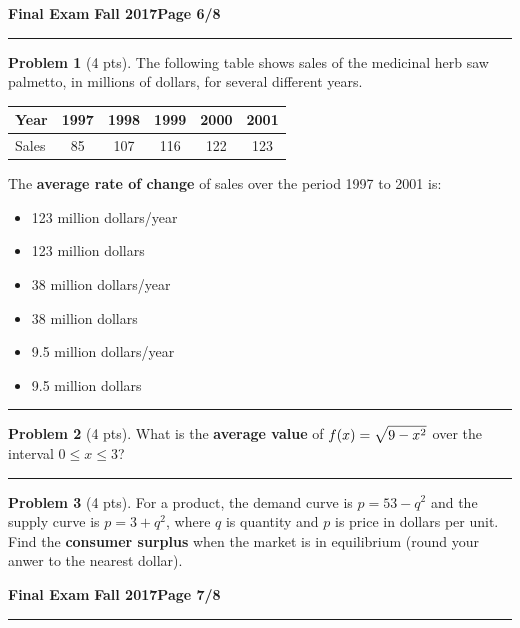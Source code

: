 \documentclass[12pt]{article}
\makeatletter
\theoremstyle{definition}
\newtheorem{problem}{Problem}
\newcommand*{\radiobutton}{%
  \@ifstar{\@radiobutton0}{\@radiobutton1}%
}
\newcommand*{\@radiobutton}[1]{%
  \begin{tikzpicture}
    \pgfmathsetlengthmacro\radius{height("X")/2}
    \draw[radius=\radius] circle;
    \ifcase#1 \fill[radius=.6*\radius] circle;\fi
  \end{tikzpicture}%
}
\makeatother
\begin{document}
\hfill{\large\bf Final Exam}\hfill{\large\bf
  Fall 2017}\hfill{\large\bf Page 6/8}\hrule

\bigskip 

\begin{problem}[4 pts]
The following table shows sales of the medicinal herb saw palmetto, in millions of dollars, for several different years.  
\begin{center}
\begin{tabular}{|l||c|c|c|c|c|}
\hline
Year & 1997 & 1998 & 1999 & 2000 & 2001 \\ \hline
Sales & 85  &  107 &  116 &  122 &  123 \\ \hline
\end{tabular}
\end{center}
The \textbf{average rate of change} of sales over the period 1997 to 2001 is:
\begin{itemize}
\item[\radiobutton] 123 million dollars/year
\item[\radiobutton] 123 million dollars
\item[\radiobutton] 38 million dollars/year
\item[\radiobutton] 38 million dollars
\item[\radiobutton] 9.5 million dollars/year
\item[\radiobutton] 9.5 million dollars
\end{itemize}
\end{problem}

\hrule

\begin{problem}[4 pts]
What is the \textbf{average value} of $f(x) = \displaystyle{\sqrt{\vphantom{\lvert} 9-x^2}}$ over the interval $0 \leq x \leq 3$? 
\end{problem}
\vspace{4cm}
\hrule

\begin{problem}[4 pts]
For a product, the demand curve is $p=53-q^2$ and the supply curve is $p=3+q^2$, where $q$ is quantity and $p$ is price in dollars per unit. Find the \textbf{consumer surplus} when the market is in equilibrium (round your anwer to the nearest dollar).
\end{problem}

\newpage

\hfill{\large\bf Final Exam}\hfill{\large\bf
  Fall 2017}\hfill{\large\bf Page 7/8}\hrule
\end{document}
